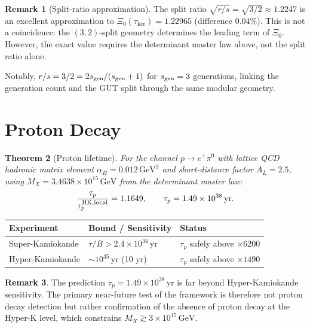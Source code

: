 \documentclass[12pt]{article}
\theoremstyle{plain}
\newtheorem{theorem}{Theorem}[section]
\theoremstyle{definition}
\newtheorem{remark}[theorem]{Remark}
\numberwithin{equation}{section}
\newcommand{\kker}{\mathrm{ker}}
\begin{document}
\begin{remark}[Split-ratio approximation]
The split ratio $\sqrt{r/s}=\sqrt{3/2}\approx1.2247$ is an excellent
approximation to $\Xi_0(\tau_{\kker})=1.22965$ (difference $0.04\%$).
This is not a coincidence: the $(3,2)$-split geometry determines the
leading term of $\Xi_0$.  However, the exact value requires the
determinant master law above, not the split ratio alone.

Notably, $r/s=3/2=2s_{\rm gen}/(s_{\rm gen}+1)$ for $s_{\rm gen}=3$
generations, linking the generation count and the GUT split through the
same modular geometry.
\end{remark}

\section{Proton Decay}\label{sec:protondecay}

\begin{theorem}[Proton lifetime]\label{thm:protondecay}
For the channel $p\to e^+\pi^0$ with lattice QCD hadronic matrix element
$\alpha_H=0.012\,\mathrm{GeV}^3$ and short-distance factor $A_L=2.5$,
using $M_X=3.4638\times10^{15}\,\mathrm{GeV}$ from the determinant master law:
\[
\frac{\tau_p}{\tau_p^{\rm HK,local}} = 1.1649,
\qquad
\tau_p = 1.49\times10^{38}\,\mathrm{yr}.
\]
\end{theorem}

\begin{center}
\begin{tabular}{lll}
\toprule
Experiment & Bound / Sensitivity & Status\\
\midrule
Super-Kamiokande & $\tau/B > 2.4\times10^{34}\,\mathrm{yr}$ & $\tau_p$ safely above $\times6200$ \\
Hyper-Kamiokande & $\sim10^{35}\,\mathrm{yr}$ (10 yr) & $\tau_p$ safely above $\times1490$\\
\bottomrule
\end{tabular}
\end{center}

\begin{remark}
The prediction $\tau_p=1.49\times10^{38}\,\mathrm{yr}$ is far beyond
Hyper-Kamiokande sensitivity.  The primary near-future test of the
framework is therefore not proton decay detection but rather confirmation
of the absence of proton decay at the Hyper-K level, which constrains
$M_X\gtrsim3\times10^{15}\,\mathrm{GeV}$.
\end{remark}

\end{document}
